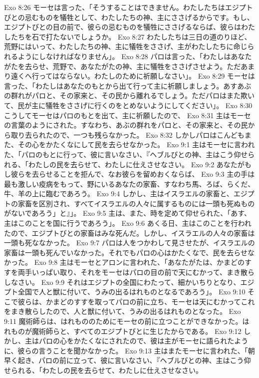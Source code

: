 Exo 8:26  モーセは言った、「そうすることはできません。わたしたちはエジプトびとの忌むものを犠牲として、わたしたちの神、主にささげるからです。もし、エジプトびとの目の前で、彼らの忌むものを犠牲にささげるならば、彼らはわたしたちを石で打たないでしょうか。
Exo 8:27  わたしたちは三日の道のりほど、荒野にはいって、わたしたちの神、主に犠牲をささげ、主がわたしたちに命じられるようにしなければなりません」。
Exo 8:28  パロは言った、「わたしはあなたがたを去らせ、荒野で、あなたがたの神、主に犠牲をささげさせよう。ただあまり遠くへ行ってはならない。わたしのために祈願しなさい」。
Exo 8:29  モーセは言った、「わたしはあなたのもとから出て行って主に祈願しましょう。あすあぶの群れがパロと、その家来と、その民から離れるでしょう。ただパロはまた欺いて、民が主に犠牲をささげに行くのをとめないようにしてください」。
Exo 8:30  こうしてモーセはパロのもとを出て、主に祈願したので、
Exo 8:31  主はモーセの言葉のようにされた。すなわち、あぶの群れをパロと、その家来と、その民から取り去られたので、一つも残らなかった。
Exo 8:32  しかしパロはこんどもまた、その心をかたくなにして民を去らせなかった。
Exo 9:1  主はモーセに言われた、「パロのもとに行って、彼に言いなさい、『ヘブルびとの神、主はこう仰せられる、「わたしの民を去らせて、わたしに仕えさせなさい。
Exo 9:2  あなたがもし彼らを去らせることを拒んで、なお彼らを留めおくならば、
Exo 9:3  主の手は最も激しい疫病をもって、野にいるあなたの家畜、すなわち馬、ろば、らくだ、牛、羊の上に臨むであろう。
Exo 9:4  しかし、主はイスラエルの家畜と、エジプトの家畜を区別され、すべてイスラエルの人々に属するものには一頭も死ぬものがないであろう」と』」。
Exo 9:5  主は、また、時を定めて仰せられた、「あす、主はこのことを国に行うであろう」。
Exo 9:6  あくる日、主はこのことを行われたので、エジプトびとの家畜はみな死んだ。しかし、イスラエルの人々の家畜は一頭も死ななかった。
Exo 9:7  パロは人をつかわして見させたが、イスラエルの家畜は一頭も死んでいなかった。それでもパロの心はかたくなで、民を去らせなかった。
Exo 9:8  主はモーセとアロンに言われた、「あなたがたは、かまどのすすを両手いっぱい取り、それをモーセはパロの目の前で天にむかって、まき散らしなさい。
Exo 9:9  それはエジプトの全国にわたって、細かいちりとなり、エジプト全国で人と獣に付いて、うみの出るはれものとなるであろう」。
Exo 9:10  そこで彼らは、かまどのすすを取ってパロの前に立ち、モーセは天にむかってこれをまき散らしたので、人と獣に付いて、うみの出るはれものとなった。
Exo 9:11  魔術師らは、はれもののためにモーセの前に立つことができなかった。はれものが魔術師らと、すべてのエジプトびとに生じたからである。
Exo 9:12  しかし、主はパロの心をかたくなにされたので、彼は主がモーセに語られたように、彼らの言うことを聞かなかった。
Exo 9:13  主はまたモーセに言われた、「朝早く起き、パロの前に立って、彼に言いなさい、『ヘブルびとの神、主はこう仰せられる、「わたしの民を去らせて、わたしに仕えさせなさい。
